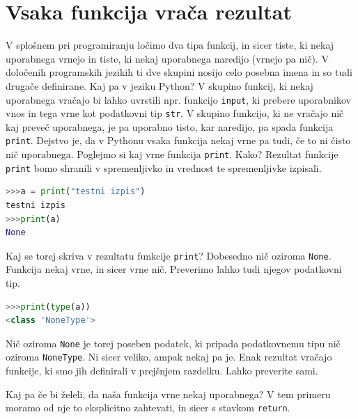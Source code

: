 \section{Vsaka funkcija vrača rezultat}
V splošnem pri programiranju ločimo dva tipa funkcij, in sicer tiste, ki nekaj uporabnega vrnejo in tiste, ki nekaj uporabnega naredijo (vrnejo pa nič). V določenih programskih jezikih ti dve skupini nosijo celo posebna imena in so tudi drugače definirane. Kaj pa v jeziku Python? V skupino funkcij, ki nekaj uporabnega vračajo bi lahko uvrstili npr. funkcijo \texttt{input}, ki prebere uporabnikov vnos in tega vrne kot podatkovni tip \texttt{str}. V skupino funkcijo, ki ne vračajo nič kaj preveč uporabnega, je pa uporabno tisto, kar naredijo, pa spada funkcija \texttt{print}. Dejstvo je, da v Pythonu vsaka funkcija nekaj vrne pa tudi, če to ni čisto nič uporabnega. Poglejmo si kaj vrne funkcija \texttt{print}. Kako? Rezultat funkcije \texttt{print} bomo shranili v spremenljivko in vrednost te spremenljivke izpisali.
\begin{lstlisting}[language=Python]
>>>a = print("testni izpis")
testni izpis
>>>print(a)
None
\end{lstlisting}
Kaj se torej skriva v rezultatu funkcije \texttt{print}? Dobesedno nič oziroma \texttt{None}. Funkcija nekaj vrne, in sicer vrne nič. Preverimo lahko tudi njegov podatkovni tip.
\begin{lstlisting}[language=Python]
>>>print(type(a))
<class 'NoneType'>
\end{lstlisting}
Nič oziroma \texttt{None} je torej poseben podatek, ki pripada podatkovnemu tipu nič oziroma \texttt{NoneType}. Ni sicer veliko, ampak nekaj pa je. Enak rezultat vračajo funkcije, ki smo jih definirali v prejšnjem razdelku. Lahko preverite sami.

Kaj pa če bi želeli, da naša funkcija vrne nekaj uporabnega? V tem primeru moramo od nje to eksplicitno zahtevati, in sicer s stavkom \texttt{return}.

